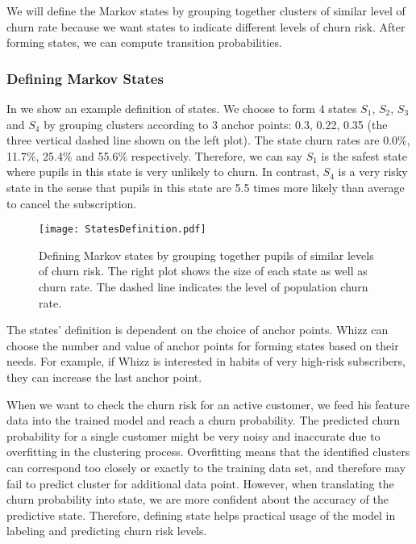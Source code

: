 We will define the Markov states by grouping together clusters of similar level of churn rate because we want states to indicate different levels of churn risk. After forming states, we can compute transition probabilities.

\subsubsection{Defining Markov States}

In  we show an example definition of states. We choose to form 4 states $S_1$, $S_2$, $S_3$ and $S_4$ by grouping clusters according to 3 anchor points: 0.3, 0.22, 0.35 (the three vertical dashed line shown on the left plot). The state churn rates are 0.0\%, 11.7\%, 25.4\% and 55.6\% respectively. Therefore, we can say $S_1$ is the safest state where pupils in this state is very unlikely to churn. In contrast, $S_4$ is a very risky state in the sense that pupils in this state are 5.5 times more likely than average to cancel the subscription.

\begin{figure}[!h]
\centering
\texttt{[image: StatesDefinition.pdf]}
\caption{Defining Markov states by grouping together pupils of similar levels of churn risk. The right plot shows the size of each state as well as churn rate. The dashed line indicates the level of population churn rate.}
\label{fig:statesDefinition}
\end{figure}

The states' definition is dependent on the choice of anchor points. Whizz can choose the number and value of anchor points for forming states based on their needs. For example, if Whizz is interested in habits of very high-risk subscribers, they can increase the last anchor point.

When we want to check the churn risk for an active customer, we feed his feature data into the trained model and reach a churn probability. The predicted churn probability for a single customer might be very noisy and inaccurate due to overfitting in the clustering process. Overfitting means that the identified clusters can correspond too closely or exactly to the training data set, and therefore may fail to predict cluster for additional data point. However, when translating the churn probability into state, we are more confident about the accuracy of the predictive state. Therefore, defining state helps practical usage of the model in labeling and predicting churn risk levels.

